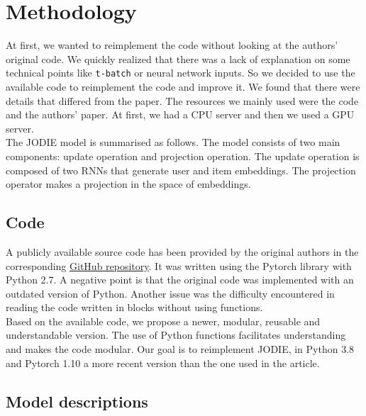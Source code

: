 \section*{Methodology}

At first, we wanted to reimplement the code without looking at the authors' original code. We quickly realized that there was a lack of explanation on some technical points like \texttt{t-batch} or neural network inputs. So we decided to use the available code to reimplement the code and improve it. We found that there were details that differed from the paper. The resources we mainly used were the code and the authors' paper. At first, we had a CPU server and then we used a GPU server.\\

The JODIE model is summarised as follows. The model consists of two main components: update operation and projection operation. The update operation is composed of two RNNs that generate user and item embeddings. The projection operator makes a projection in the space of embeddings.

\subsection*{Code}

A publicly available source code has been provided by the original authors in the corresponding \href{https://github.com/srijankr/jodie}{GitHub repository}. It was written using the Pytorch \supercite{NEURIPS2019_bdbca288} library with Python 2.7. A negative point is that the original code was implemented with an outdated version of Python. Another issue was the difficulty encountered in reading the code written in blocks without using functions.\\

Based on the available code, we propose a newer, modular, reusable and understandable version. The use of Python functions facilitates understanding and makes the code modular. Our goal is to reimplement JODIE, in Python 3.8 and Pytorch \supercite{NEURIPS2019_bdbca288} 1.10 a more recent version than the one used in the article.

\subsection*{Model descriptions}

